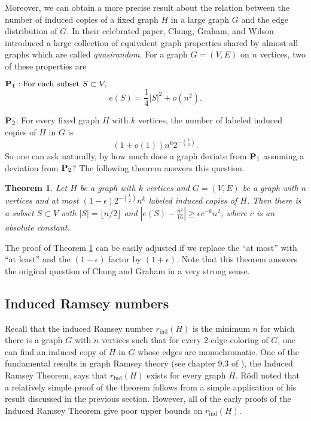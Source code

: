 \documentclass[11pt]{article}
\newtheorem{theorem}{Theorem}[section]
\begin{document}
Moreover, we can obtain a more precise result about the relation
between the number of induced copies of a fixed graph $H$ in a large graph $G$
and the edge distribution of $G$.
In their celebrated paper, Chung, Graham, and Wilson
\cite{ChGrWi} introduced a large collection of equivalent graph
properties shared by almost all graphs which are called {\it
quasirandom}. For a graph $G=(V,E)$ on $n$ vertices, two of these
properties are

\vspace{0.1cm}
${\bf P_1}:\textrm{For each subset}~S \subset V,$
$$e(S)=\frac{1}{4}|S|^2+o(n^2).$$

${\bf P}_2$: For every fixed graph $H$ with $k$ vertices, the number
of labeled induced copies of $H$ in $G$ is
 $$(1+o(1))n^{k}2^{-{k \choose 2}}.$$
So one can ask naturally, by how much does a graph deviate from ${\bf
P}_1$ assuming a deviation from ${\bf P}_2$? The following theorem
answers this question.

\begin{theorem}\label{dev} Let $H$ be a graph with $k$ vertices and $G=(V,E)$ be a
graph with $n$ vertices and at most $(1-\epsilon)2^{-{k \choose
2}}n^k$ labeled induced copies of $H$. Then there is a subset $S
\subset V$ with $|S|=\lfloor n/2 \rfloor$ and $|e(S)-\frac{n^2}{16}|
\geq \epsilon c^{-k} n^2$, where $c$ is an absolute constant.
\end{theorem}

The proof of Theorem \ref{dev} can be easily adjusted if we
replace the ``at most'' with ``at least'' and the $(1-\epsilon)$
factor by $(1+\epsilon)$.  Note that this theorem answers the
original question of Chung and Graham in a very strong sense.

\subsection{Induced Ramsey numbers}\label{inducedsubsection}

Recall that the induced Ramsey number $r_{\textrm{ind}}(H)$ is the
minimum $n$ for which there is a graph $G$ with $n$ vertices such
that for every $2$-edge-coloring of $G$, one can find an induced
copy of $H$ in $G$ whose edges are monochromatic. One of the
fundamental results in graph Ramsey theory (see chapter 9.3 of
\cite{Di}), the Induced Ramsey Theorem, says that
$r_{\textrm{ind}}(H)$ exists for every graph $H$. R\"odl \cite{Ro}
noted that a relatively simple proof of the theorem follows from a
simple application of his result discussed in the previous section.
However, all of the early proofs of the Induced Ramsey Theorem give
poor upper bounds on $r_{\textrm{ind}}(H)$.
\end{document}
